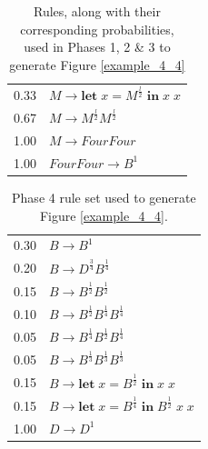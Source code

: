 \documentclass{article}
\begin{document}
\begin{table}
\centering
\begin{tabular}{ll}
0.33 & $M \rightarrow \textbf{let} \; x = M^\frac{l}{2} \; \textbf{in} \; x \; x$\\
0.67 & $M \rightarrow M^\frac{l}{2} M^\frac{l}{2}$\\
1.00 & $M \rightarrow FourFour$\\
1.00 & $FourFour \rightarrow B^1$\\
\end{tabular}
\caption{Rules, along with their corresponding probabilities, used in Phases 1, 2 \& 3 to generate Figure \ref{example_4_4}}\label{4_4rules_phases123}
\end{table}

\begin{table}
\centering
\begin{tabular}{ll}
0.30 & $B \rightarrow B^1$\\
0.20 & $B \rightarrow D^\frac{3}{4} B^\frac{1}{4}$\\
0.15 & $B \rightarrow B^\frac{1}{2} B^\frac{1}{2}$\\
0.10 & $B \rightarrow B^\frac{1}{2} B^\frac{1}{4} B^\frac{1}{4}$\\
0.05 & $B \rightarrow B^\frac{1}{4} B^\frac{1}{2} B^\frac{1}{4}$\\
0.05 & $B \rightarrow B^\frac{1}{3} B^\frac{1}{3} B^\frac{1}{3}$\\
0.15 & $B \rightarrow \textbf{let} \; x = B^\frac{1}{2} \; \textbf{in} \; x \; x$\\ 
0.15 & $B \rightarrow \textbf{let} \; x = B^\frac{1}{4} \; \textbf{in} \; B^\frac{1}{2} \; x \; x$\\ 
1.00 & $D \rightarrow D^1$\\
\end{tabular}
\caption{Phase 4 rule set used to generate Figure \ref{example_4_4}.}\label{4_4rules}
\end{table}

\end{document}
